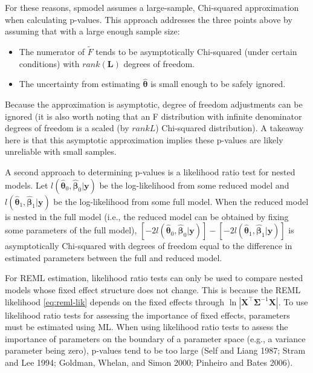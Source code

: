 \documentclass{article}
\providecommand{\tightlist}{%
  \setlength{\itemsep}{0pt}\setlength{\parskip}{0pt}}
\begin{document}
For these reasons, spmodel assumes a large-sample, Chi-squared
approximation when calculating p-values. This approach addresses the
three points above by assuming that with a large enough sample size:

\begin{itemize}
\tightlist
\item
  The numerator of \(\tilde{F}\) tends to be asymptotically Chi-squared
  (under certain conditions) with \(rank(\mathbf{L})\) degrees of
  freedom.
\item
  The uncertainty from estimating \(\bm{\hat{\theta}}\) is small enough
  to be safely ignored.
\end{itemize}

Because the approximation is asymptotic, degree of freedom adjustments
can be ignored (it is also worth noting that an F distribution with
infinite denominator degrees of freedom is a scaled (by \(rank{L}\))
Chi-squared distribution). A takeaway here is that this asymptotic
approximation implies these p-values are likely unreliable with small
samples.

A second approach to determining p-values is a likelihood ratio test for
nested models. Let
\(l(\bm{\hat{\theta}}_0, \bm{\hat{\beta}}_0 | \mathbf{y} )\) be the
log-likelihood from some reduced model and
\(l(\bm{\hat{\theta}}_1, \bm{\hat{\beta}}_1 | \mathbf{y} )\) be the
log-likelihood from some full model. When the reduced model is nested in
the full model (i.e., the reduced model can be obtained by fixing some
parameters of the full model),
\([-2l(\bm{\hat{\theta}}_0, \bm{\hat{\beta}}_0 | \mathbf{y} )] - [-2l(\bm{\hat{\theta}}_1, \bm{\hat{\beta}}_1 | \mathbf{y} )]\)
is asymptotically Chi-squared with degrees of freedom equal to the
difference in estimated parameters between the full and reduced model.

For REML estimation, likelihood ratio tests can only be used to compare
nested models whose fixed effect structure does not change. This is
because the REML likelihood \eqref{eq:reml-lik} depends on the fixed
effects through
\(\ln{|\mathbf{X}^\intercal \mathbf{\Sigma}^{-1} \mathbf{X}|}\). To use
likelihood ratio tests for assessing the importance of fixed effects,
parameters must be estimated using ML. When using likelihood ratio tests
to assess the importance of parameters on the boundary of a parameter
space (e.g., a variance parameter being zero), p-values tend to be too
large (Self and Liang 1987; Stram and Lee 1994; Goldman, Whelan, and
Simon 2000; Pinheiro and Bates 2006).
\end{document}
